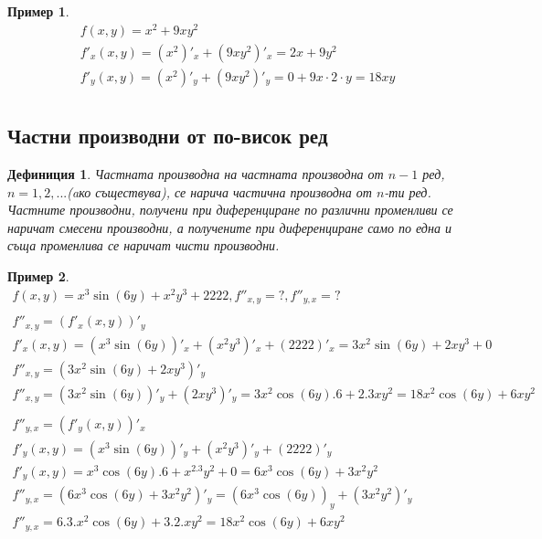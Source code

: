 \documentclass[a4paper,fleqn,12pt]{article}
\newtheorem{definition}{Дефиниция}[subsection]
\theoremstyle{definition}
\newtheorem{example}{Пример}[subsection]
\begin{document}
\begin{example}
\begin{gather*}
f(x,y) = x^2 + 9xy^2\\
f'_x (x,y) = (x^2)'_x+(9xy^2)'_x = 2x + 9y^2\\
f'_y (x,y) = (x^2)'_y+(9xy^2)'_y = 0 + 9x \cdot 2 \cdot y = 18xy \\
\end{gather*}
\end{example}

\subsection{Частни производни от по-висок ред}

\begin{definition}
Частната производна на частната производна от $n-1$ ред, $n = 1, 2, ...$(aко съществува), се нарича частична производна от $n$-ти ред. Частните производни, получени при диференциране по различни променливи се наричат смесени производни, а получените при диференциране само по една и съща променлива се наричат чисти производни. 
\end{definition}

\begin{example}
\begin{gather*}
f(x,y) = x^3\sin(6y) + x^2y^3 + 2222, f''_{x,y} = ?, f''_{y,x} = ? \\
\\
f''_{x,y} = (f'_x(x,y))'_y\\
f'_x(x,y) =(x^3\sin(6y))'_x + (x^2y^3)'_x + (2222)'_x = 3x^2 \sin(6y) + 2xy^3 + 0 \\
f''_{x,y} = (3x^2 \sin(6y) + 2xy^3)'_y \\
f''_{x,y} = (3x^2 \sin(6y))'_y + (2xy^3)'_y  =3x^2 \cos(6y).6 + 2.3xy^2 = 18x^2\cos(6y) + 6xy^2\\
\\
f''_{y,x} = (f'_y(x,y))'_x\\
f'_y (x,y) =(x^3\sin(6y))'_y + (x^2y^3)'_y + (2222)'_y \\
f'_y (x,y) = x^3 \cos(6y).6 + x^2.3y^2 + 0 = 6x^3 \cos(6y) + 3x^2y^2 \\
f''_{y,x} = (6x^3 \cos(6y) + 3x^2y^2)'_y = (6x^3 \cos(6y))_y + (3x^2y^2)'_y \\
f''_{y,x} = 6.3.x^2 \cos(6y) + 3.2.xy^2 = 18x^2\cos(6y) + 6xy^2 \\
\end{gather*}
\end{example}
\end{document}
